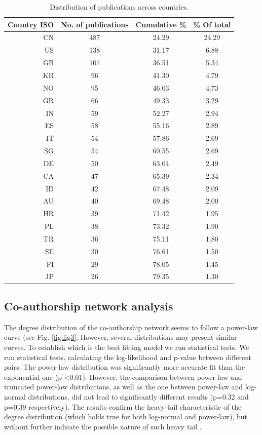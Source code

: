 \documentclass[a4paper, review, endfloat, authoryear]{elsarticle}
\begin{document}
	\begin{table}[h]
		\centering
		\caption{Distribution of publications across countries.}
		\begin{tabular}{r c c c}
			\hline
			Country ISO & No. of publications & Cumulative \% & \% Of total \\
			\hline
			CN & 487 & 24.29 & 24.29\\
			US & 138 & 31.17 & 6.88\\
			GB & 107 & 36.51 & 5.34\\
			KR & 96 & 41.30 & 4.79\\
			NO & 95 & 46.03 & 4.73\\
			GR & 66 & 49.33 & 3.29\\
			IN & 59 & 52.27 & 2.94\\
			ES & 58 & 55.16 & 2.89\\
			IT & 54 & 57.86 & 2.69\\
			SG & 54 & 60.55 & 2.69\\
			DE & 50 & 63.04 & 2.49\\
			CA & 47 & 65.39 & 2.34\\
			ID & 42 & 67.48 & 2.09\\
			AU & 40 & 69.48 & 2.00\\
			HR & 39 & 71.42 & 1.95\\
			PL & 38 & 73.32 & 1.90\\
			TR & 36 & 75.11 & 1.80\\
			SE & 30 & 76.61 & 1.50\\
			FI & 29 & 78.05 & 1.45\\
			JP & 26 & 79.35 & 1.30\\
			\hline
		\end{tabular}
		\label{tab:resdesccountry}
	\end{table}

	\subsection{Co-authorship network analysis}
	The degree distribution of the co-authorship network seems to follow a power-law curve (see Fig. \ref{fig:fig3}. However, several distributions may present similar curves. To establish which is the best fitting model we run statistical tests. We run statistical tests, calculating the log-likelihood and p-value between different pairs. The power-law distribution was significantly more accurate fit than the exponential one (p \textless 0.01). However, the comparison between power-law and truncated power-law distributions, as well as the one between power-law and log-normal distributions, did not lead to significantly different results (p=0.32 and p=0.39 respectively). The results confirm the heavy-tail characteristic of the degree distribution (which holds true for both log-normal and power-law), but without further indicate the possible nature of such heavy tail \citep{mitzenmacher2004brief,higaki2020co,liu2021structural,smith2021explaining}.
	
\end{document}

